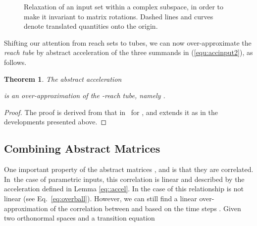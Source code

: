 \documentclass{IEEEtran}
\newtheorem{theorem}{Theorem}
\begin{document}
\begin{figure}
\centering
{}
\caption{Relaxation of an input set within a complex subspace, 
in order to make it invariant to matrix rotations.  
Dashed lines and curves denote translated quantities onto the origin. }
\label{aa:varinputs}
\end{figure}

Shifting our attention from reach sets to tubes, 
we can now over-approximate the {\it reach tube} by abstract acceleration of the three summands in (\ref{equ:accinput2}), as follows. 
\begin{theorem}
The abstract acceleration

is an over-appro\-xi\-mation of the -reach tube, 
namely .
\end{theorem}
\begin{proof}
The proof is derived from that in~\cite{JSS14} for , 
and extends it as in the developments presented above.
\end{proof}

\subsection{Combining Abstract Matrices}\label{sec:comb_matrices}


One important property of the abstract matrices ,
 and  is that they are correlated.  In~the case of parametric
inputs, this correlation is linear and described by the acceleration defined
in Lemma \eqref{eq::accel}.  In the case of  this
relationship is not linear (see Eq.~\ref{eq:overball}).  However, we can
still find a linear over-approximation of the correlation between
 and  based on the time steps .  Given
two orthonormal spaces  and a
transition equation
\end{document}
